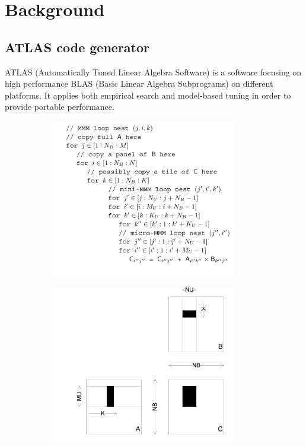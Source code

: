 \section{Background}
\label{sec:background}

  \subsection{ATLAS code generator}
  \label{sec:atlas_intro}
  ATLAS (Automatically Tuned Linear Algebra Software) is a software focusing on high performance 
  BLAS (Basic Linear Algebra Subprograms) on different platforms. It applies both empirical search and model-based 
  tuning in order to provide portable performance. \par
  

  \begin{figure}
  \centering
  \begin{subfigure}{1.0\linewidth}
    \centering
    \includegraphics[width=0.9\textwidth]{images/ATLAS_code.png}
    \caption{}
    \label{fig:ATLAS_code}
  \end{subfigure}
  \begin{subfigure}[t]{1.0\linewidth}
    \centering
    \includegraphics[width=0.9\textwidth]{images/ATLAS_pic.png}

\end{subfigure}
\end{figure}
